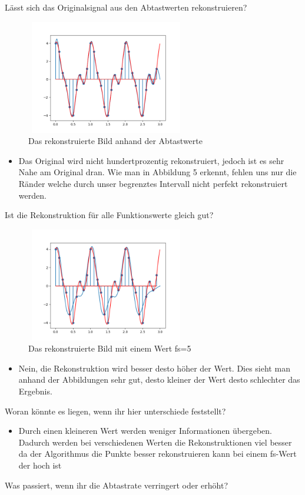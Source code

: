 \documentclass[a4paper, 11pt]{article}
\begin{document}
     Lässt sich das Originalsignal aus den Abtastwerten rekonstruieren?\\
     \begin{figure}[h]
        \centering
        \includegraphics[height=5cm, width = 7cm]{ABild231.png}
        \caption{Das rekonstruierte Bild anhand der Abtastwerte}
      \end{figure}
     \begin{itemize}
        \item Das Original wird nicht hundertprozentig rekonstruiert, jedoch ist es sehr Nahe am Original dran. Wie man in Abbildung 5 erkennt, fehlen uns nur die Ränder welche durch unser begrenztes Intervall nicht perfekt rekonstruiert werden.
        
    \end{itemize}
     Ist die Rekonstruktion für alle Funktionswerte gleich gut?\\

     \begin{figure}[h]
        \centering
        \includegraphics[height=5cm, width = 7cm]{ABild230.png}
        \caption{Das rekonstruierte Bild mit einem Wert fs=5}
      \end{figure}
     \begin{itemize}
        \item Nein, die Rekonstruktion wird besser desto höher der Wert. Dies sieht man anhand der Abbildungen sehr gut, desto kleiner der Wert desto schlechter das Ergebnis.
     \end{itemize}
     Woran könnte es liegen, wenn ihr hier unterschiede feststellt?\\
     \begin{itemize}
        \item Durch einen kleineren Wert werden weniger Informationen übergeben. Dadurch werden bei verschiedenen Werten die Rekonstruktionen viel besser da der Algorithmus die Punkte besser rekonstruieren kann bei einem fs-Wert der hoch ist
     \end{itemize}
     Was passiert, wenn ihr die Abtastrate verringert oder erhöht?\\
     
\end{document}
